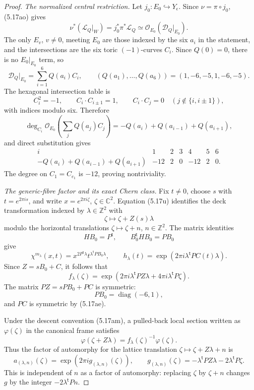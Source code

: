 \begin{proof}
\emph{The normalized central restriction.}
Let \(j_0:E_0\hookrightarrow Y_\epsilon\).  Since
\(\nu=\pi\circ j_0\), (5.17ao) gives
\[
 \nu^*(\mathcal L_Q|_W)
 =j_0^*\pi^*\mathcal L_Q
 \simeq\mathcal O_{E_0}(\mathcal D_Q|_{E_0}).
\tag{5.17ap}
\]
The only \(E_v\), \(v\ne0\), meeting \(E_0\) are those indexed by the
six \(a_i\) in the statement, and the intersections are the six toric
\((-1)\)-curves \(C_i\).  Since \(Q(0)=0\), there is no
\(E_0|_{E_0}\) term, so
\[
 \mathcal D_Q|_{E_0}
 =\sum_{i=1}^6Q(a_i)C_i,
 \qquad
 (Q(a_1),\ldots,Q(a_6))=(1,-6,-5,1,-6,-5).
\tag{5.17aq}
\]
The hexagonal intersection table is
\[
 C_i^2=-1,
 \qquad
 C_i\cdot C_{i\pm1}=1,
 \qquad
 C_i\cdot C_j=0
 \quad(j\notin\{i,i\pm1\}),
\tag{5.17ar}
\]
with indices modulo six.  Therefore
\[
 \deg_{C_i}\mathcal O_{E_0}
 \!\left(\sum_jQ(a_j)C_j\right)
 =-Q(a_i)+Q(a_{i-1})+Q(a_{i+1}),
\]
and direct substitution gives
\[
 \begin{array}{c|rrrrrr}
 i&1&2&3&4&5&6\\ \hline
 -Q(a_i)+Q(a_{i-1})+Q(a_{i+1})
 &-12&2&0&-12&2&0.
 \end{array}
\tag{5.17as}
\]
The degree on \(C_1=C_{e_1}\) is \(-12\), proving nontriviality.

\emph{The generic-fibre factor and its exact Chern class.}
Fix \(t\ne0\), choose \(s\) with \(t=e^{2\pi i s}\), and write
\(x=e^{2\pi i\zeta}\), \(\zeta\in\mathbb C^2\).
Equation (5.17u) identifies the deck transformation indexed by
\(\lambda\in\mathbb Z^2\) with
\[
 \zeta\longmapsto\zeta+Z(s)\lambda
\]
modulo the horizontal translations
\(\zeta\mapsto\zeta+n\), \(n\in\mathbb Z^2\).  The matrix identities
\[
 HB_0=P^{\mathsf t},
 \qquad
 B_0^{\mathsf t}HB_0=PB_0
\tag{5.17at}
\]
give
\[
 \chi^{m_\lambda}(x,t)
 =x^{2P^{\mathsf t}\lambda}
  t^{\lambda^{\mathsf t}PB_0\lambda},
\qquad
 h_\lambda(t)
 =\exp(2\pi i\lambda^{\mathsf t}PC(t)\lambda).
\]
Since \(Z=sB_0+C\), it follows that
\[
 f_\lambda(\zeta)
 =\exp\!\left(
 2\pi i\lambda^{\mathsf t}PZ\lambda+
 4\pi i\lambda^{\mathsf t}P\zeta\right).
\tag{5.17au}
\]
The matrix \(PZ=sPB_0+PC\) is symmetric:
\[
 PB_0=\operatorname{diag}(-6,1),
\]
and \(PC\) is symmetric by (5.17ae).

Under the descent convention (5.17am), a pulled-back local section
written as \(\varphi(\zeta)\) in the canonical frame satisfies
\[
 \varphi(\zeta+Z\lambda)
 =f_\lambda(\zeta)^{-1}\varphi(\zeta).
\]
Thus the factor of automorphy for the lattice translation
\(\zeta\mapsto\zeta+Z\lambda+n\) is
\[
 a_{(\lambda,n)}(\zeta)
 =\exp(2\pi i g_{(\lambda,n)}(\zeta)),
\qquad
 g_{(\lambda,n)}(\zeta)
 =-\lambda^{\mathsf t}PZ\lambda
  -2\lambda^{\mathsf t}P\zeta.
\tag{5.17av}
\]
This is independent of \(n\) as a factor of automorphy: replacing
\(\zeta\) by \(\zeta+n\) changes \(g\) by the integer
\(-2\lambda^{\mathsf t}Pn\).


\end{proof}
